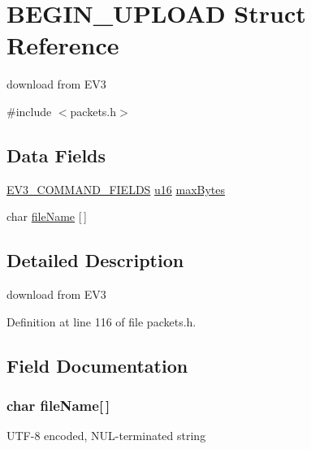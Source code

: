 \hypertarget{struct_b_e_g_i_n___u_p_l_o_a_d}{}\section{B\+E\+G\+I\+N\+\_\+\+U\+P\+L\+O\+A\+D Struct Reference}
\label{struct_b_e_g_i_n___u_p_l_o_a_d}


download from E\+V3  




{\ttfamily \#include $<$packets.\+h$>$}

\subsection*{Data Fields}
\begin{DoxyCompactItemize}
\item 
\hyperlink{packets_8h_a0c26a010ef0da2962a751796943824c9}{E\+V3\+\_\+\+C\+O\+M\+M\+A\+N\+D\+\_\+\+F\+I\+E\+L\+D\+S} \hyperlink{defs_8h_ace9d960e74685e2cd84b36132dbbf8aa}{u16} \hyperlink{struct_b_e_g_i_n___u_p_l_o_a_d_ab90bb8e65738c294ff6c9400ea3f4b41}{max\+Bytes}
\item 
char \hyperlink{struct_b_e_g_i_n___u_p_l_o_a_d_ac7c25075c755b642c1861936c4615beb}{file\+Name} \mbox{[}$\,$\mbox{]}
\end{DoxyCompactItemize}


\subsection{Detailed Description}
download from E\+V3 

Definition at line 116 of file packets.\+h.



\subsection{Field Documentation}
\hypertarget{struct_b_e_g_i_n___u_p_l_o_a_d_ac7c25075c755b642c1861936c4615beb}{}
\subsubsection[{file\+Name}]{\setlength{\rightskip}{0pt plus 5cm}char file\+Name\mbox{[}$\,$\mbox{]}}\label{struct_b_e_g_i_n___u_p_l_o_a_d_ac7c25075c755b642c1861936c4615beb}
U\+T\+F-\/8 encoded, N\+U\+L-\/terminated string 

